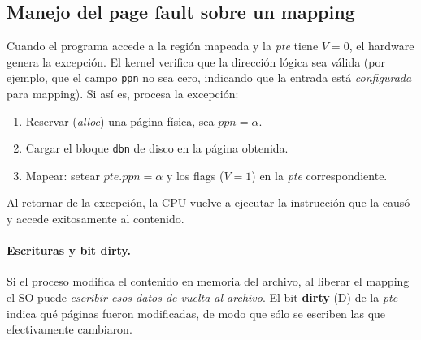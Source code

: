 \documentclass[11pt,a4paper]{article}
\begin{document}
\begin{center}
\end{center}

\subsection{Manejo del page fault sobre un mapping}

Cuando el programa accede a la región mapeada y la \emph{pte} tiene
$V=0$, el hardware genera la excepción. El kernel verifica que la
dirección lógica sea válida (por ejemplo, que el campo \texttt{ppn} no
sea cero, indicando que la entrada está \emph{configurada} para
mapping). Si así es, procesa la excepción:

\begin{enumerate}[leftmargin=*]
    \item Reservar (\emph{alloc}) una página física, sea $ppn = \alpha$.
    \item Cargar el bloque \texttt{dbn} de disco en la página obtenida.
    \item Mapear: setear $\textit{pte}.\textit{ppn} = \alpha$ y los
        flags ($V=1$) en la \emph{pte} correspondiente.
\end{enumerate}

Al retornar de la excepción, la CPU vuelve a ejecutar la instrucción que
la causó y accede exitosamente al contenido.

\paragraph{Escrituras y bit dirty.}
Si el proceso modifica el contenido en memoria del archivo, al liberar
el mapping el SO puede \emph{escribir esos datos de vuelta al archivo}.
El bit \textbf{dirty} (D) de la \emph{pte} indica qué páginas fueron
modificadas, de modo que sólo se escriben las que efectivamente
cambiaron.
\end{document}
